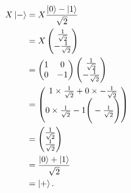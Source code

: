 \documentclass[10pt]{article}
\begin{document}
\begin{align*}
X \ket{-} &= X \frac{\ket{0} - \ket{1}}{\sqrt{2}} \\
               &= X \begin{pmatrix}
               \frac{1}{\sqrt{2}} \\
               - \frac{1}{\sqrt{2}}
               \end{pmatrix} \\
               &= \begin{pmatrix}
               1 & 0 \\
               0 & - 1 
               \end{pmatrix} \begin{pmatrix}
               \frac{1}{\sqrt{2}} \\
               - \frac{1}{\sqrt{2}}
               \end{pmatrix} \\
               & = \begin{pmatrix}
               1 \times \frac{1}{\sqrt{2}} + 0 \times -\frac{1}{\sqrt{2}} \\
               0 \times \frac{1}{\sqrt{2}} - 1 \Bigg(-\frac{1}{\sqrt{2}} \Bigg)
               \end{pmatrix} \\
                &= \begin{pmatrix}
               \frac{1}{\sqrt{2}} \\
               \frac{1}{\sqrt{2}}
               \end{pmatrix} \\
               &= \frac{\ket{0} + \ket{1}}{\sqrt{2}} \\
               &= \ket{+}.
\end{align*}
\end{document}

